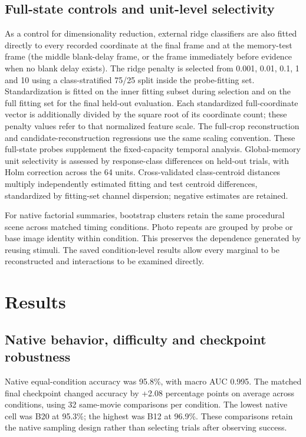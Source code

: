 \documentclass[11pt]{article}
\begin{document}
\subsection{Full-state controls and unit-level selectivity}
As a control for dimensionality reduction, external ridge classifiers are also fitted directly to every recorded coordinate at the final frame and at the memory-test frame (the middle blank-delay frame, or the frame immediately before evidence when no blank delay exists). The ridge penalty is selected from 0.001, 0.01, 0.1, 1 and 10 using a class-stratified 75/25 split inside the probe-fitting set. Standardization is fitted on the inner fitting subset during selection and on the full fitting set for the final held-out evaluation. Each standardized full-coordinate vector is additionally divided by the square root of its coordinate count; these penalty values refer to that normalized feature scale. The full-crop reconstruction and candidate-reconstruction regressions use the same scaling convention. These full-state probes supplement the fixed-capacity temporal analysis. Global-memory unit selectivity is assessed by response-class differences on held-out trials, with Holm correction across the 64 units. Cross-validated class-centroid distances multiply independently estimated fitting and test centroid differences, standardized by fitting-set channel dispersion; negative estimates are retained.

For native factorial summaries, bootstrap clusters retain the same procedural scene across matched timing conditions. Photo repeats are grouped by probe or base image identity within condition. This preserves the dependence generated by reusing stimuli. The saved condition-level results allow every marginal to be reconstructed and interactions to be examined directly.
\section{Results}
\subsection{Native behavior, difficulty and checkpoint robustness}
Native equal-condition accuracy was 95.8\%, with macro AUC 0.995. The matched final checkpoint changed accuracy by +2.08 percentage points on average across conditions, using 32 same-movie comparisons per condition. The lowest native cell was B20 at 95.3\%; the highest was B12 at 96.9\%. These comparisons retain the native sampling design rather than selecting trials after observing success.
\end{document}
